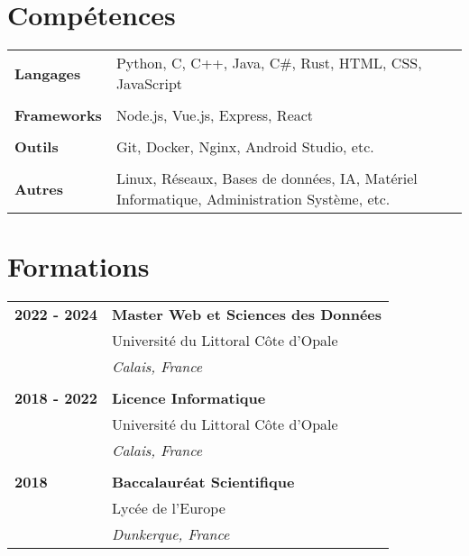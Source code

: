 \documentclass[a4paper, 12pt]{article}
\begin{document}
\begin{minipage}[t]{0.65\textwidth}

    \section*{\textcolor{sectioncolor}{Compétences}}
    \begin{tabular}{ m{} m{} }
        \textbf{Langages} & Python, C, C++, Java, C\#, Rust, HTML, CSS, JavaScript \\
        & \\
        \textbf{Frameworks} & Node.js, Vue.js, Express, React \\
        & \\
        \textbf{Outils} & Git, Docker, Nginx, Android Studio, etc. \\
        & \\
        \textbf{Autres} & Linux, Réseaux, Bases de données, IA, Matériel Informatique, Administration Système, etc. \\
    \end{tabular}

    \vspace{-0.4cm}

    \section*{\textcolor{sectioncolor}{Formations}}
    \begin{tabular}{ m{} m{} }
        \textbf{2022 - 2024} & \textbf{Master Web et Sciences des Données} \\
        & Université du Littoral Côte d'Opale \\
        & \textit{Calais, France} \\
        & \\
        \textbf{2018 - 2022} & \textbf{Licence Informatique} \\
        & Université du Littoral Côte d'Opale \\
        & \textit{Calais, France} \\
        & \\
        \textbf{2018} & \textbf{Baccalauréat Scientifique} \\
        & Lycée de l'Europe \\
        & \textit{Dunkerque, France} \\
    \end{tabular}


\end{minipage}
\end{document}
